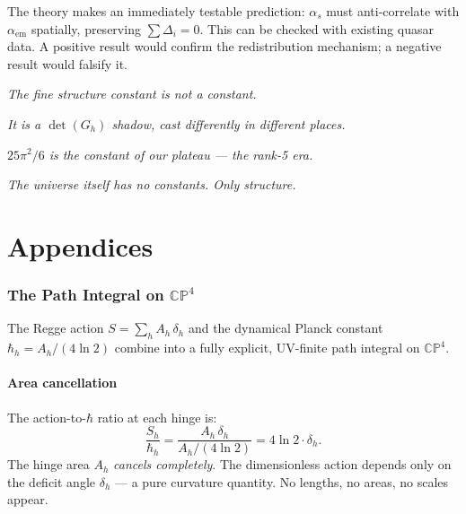 \documentclass[12pt]{article}
\theoremstyle{remark}
\theoremstyle{definition}
\begin{document}
The theory makes an immediately testable prediction: $\alpha_s$ must anti-correlate with $\alpha_\text{em}$ spatially, preserving $\sum\Delta_i = 0$. This can be checked with existing quasar data. A positive result would confirm the redistribution mechanism; a negative result would falsify it.

\begin{center}
\emph{The fine structure constant is not a constant.}

\emph{It is a $\det(G_h)$ shadow, cast differently in different places.}

\emph{$25\pi^2/6$ is the constant of our plateau --- the rank-5 era.}

\emph{The universe itself has no constants. Only structure.}
\end{center}


\appendix
\part*{Appendices}


\section{The Path Integral on $\mathbb{CP}^4$}
\label{app:path_integral}

The Regge action $S = \sum_h A_h\,\delta_h$ and the dynamical Planck constant $\hbar_h = A_h/(4\ln 2)$ combine into a fully explicit, UV-finite path integral on $\mathbb{CP}^4$.

\subsection{Area cancellation}

The action-to-$\hbar$ ratio at each hinge is:
\begin{equation}
\frac{S_h}{\hbar_h} = \frac{A_h\,\delta_h}{A_h/(4\ln 2)} = 4\ln 2 \cdot \delta_h.
\end{equation}
The hinge area $A_h$ \emph{cancels completely}. The dimensionless action depends only on the deficit angle $\delta_h$ --- a pure curvature quantity. No lengths, no areas, no scales appear.
\end{document}
